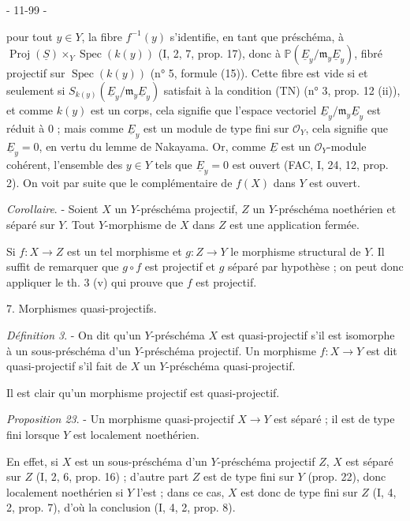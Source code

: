 \newpage


- 11-99 -

pour tout $y \in Y$, la fibre $f^{-1}(y)$ s'identifie, en tant que préschéma, à $\operatorname{Proj}(\underline{S}) \times_Y \operatorname{Spec}(k(y))$ (I, 2, 7, prop. 17), donc à $\mathbb{P}(\underline{E}_y / \mathfrak{m}_y \underline{E}_y)$, fibré projectif sur $\operatorname{Spec}(k(y))$ (n° 5, formule (15)). Cette fibre est vide si et seulement si $S_{k(y)}(\underline{E}_y / \mathfrak{m}_y \underline{E}_y)$ satisfait à la condition (TN) (n° 3, prop. 12 (ii)), et comme $k(y)$ est un corps, cela signifie que l'espace vectoriel $\underline{E}_y / \mathfrak{m}_y \underline{E}_y$ est réduit à $0$ ; mais comme $\underline{E}_y$ est un module de type fini sur $\mathcal{O}_Y$, cela signifie que $\underline{E}_y = 0$, en vertu du lemme de Nakayama. Or, comme $\underline{E}$ est un $\mathcal{O}_Y$-module cohérent, l'ensemble des $y \in Y$ tels que $\underline{E}_y = 0$ est ouvert (FAC, I, 24, 12, prop. 2). On voit par suite que le complémentaire de $f(X)$ dans $Y$ est ouvert.

\emph{Corollaire}. - Soient $X$ un $Y$-préschéma projectif, $Z$ un $Y$-préschéma noethérien et séparé sur $Y$. Tout $Y$-morphisme de $X$ dans $Z$ est une application fermée.

Si $f: X \to Z$ est un tel morphisme et $g: Z \to Y$ le morphisme structural de $Y$. Il suffit de remarquer que $g \circ f$ est projectif et $g$ séparé par hypothèse ; on peut donc appliquer le th. 3 (v) qui prouve que $f$ est projectif.

7. Morphismes quasi-projectifs.

\emph{Définition 3}. - On dit qu'un $Y$-préschéma $X$ est quasi-projectif s'il est isomorphe à un sous-préschéma d'un $Y$-préschéma projectif. Un morphisme $f: X \to Y$ est dit quasi-projectif s'il fait de $X$ un $Y$-préschéma quasi-projectif.

Il est clair qu'un morphisme projectif est quasi-projectif.

\emph{Proposition 23}. - Un morphisme quasi-projectif $X \to Y$ est séparé ; il est de type fini lorsque $Y$ est localement noethérien.

En effet, si $X$ est un sous-préschéma d'un $Y$-préschéma projectif $Z$, $X$ est séparé sur $Z$ (I, 2, 6, prop. 16) ; d'autre part $Z$ est de type fini sur $Y$ (prop. 22), donc localement noethérien si $Y$ l'est ; dans ce cas, $X$ est donc de type fini sur $Z$ (I, 4, 2, prop. 7), d'où la conclusion (I, 4, 2, prop. 8).

